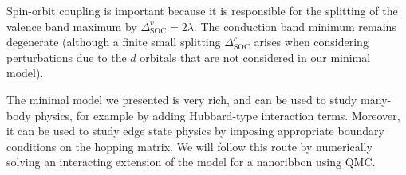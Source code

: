 Spin-orbit coupling is important because it is responsible for the splitting of the valence band maximum by $\Delta_{\text{SOC}}^v = 2 \lambda$.
The conduction band minimum remains degenerate (although a finite small splitting $\Delta_{\text{SOC}}^c$ arises when considering perturbations due to the $d$ orbitals that are not considered in our minimal model).

The minimal model we presented is very rich, and can be used to study many-body physics, for example by adding Hubbard-type interaction terms.
Moreover, it can be used to study edge state physics by imposing appropriate boundary conditions on the hopping matrix.
We will follow this route by numerically solving  an interacting extension of the model for a nanoribbon using \ac{QMC}.